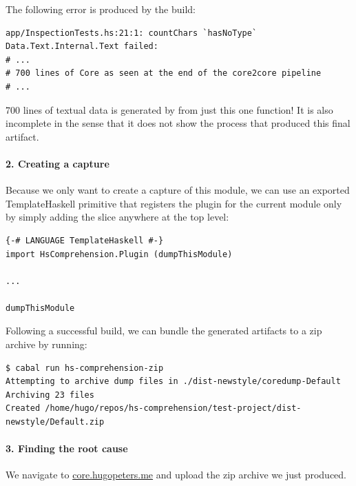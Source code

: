 The following error is produced by the build:

\begin{verbatim}
app/InspectionTests.hs:21:1: countChars `hasNoType` Data.Text.Internal.Text failed:
# ...
# 700 lines of Core as seen at the end of the core2core pipeline
# ...
\end{verbatim}

700 lines of textual data is generated by  from just this one function!
It is also incomplete in the sense that it does not show the process that produced this final
artifact.

\paragraph{2. Creating a capture}

Because we only want to create a capture of this module, we can use an exported TemplateHaskell primitive
that registers the plugin for the current module only by simply adding the  slice 
anywhere at the top level: 

\begin{listing}[H]
\begin{verbatim}
{-# LANGUAGE TemplateHaskell #-}
import HsComprehension.Plugin (dumpThisModule)

...

dumpThisModule
\end{verbatim}
\end{listing}

Following a successful build, we can bundle the generated artifacts to a zip archive by running:

\begin{listing}[H]
\begin{verbatim}
$ cabal run hs-comprehension-zip
Attempting to archive dump files in ./dist-newstyle/coredump-Default
Archiving 23 files
Created /home/hugo/repos/hs-comprehension/test-project/dist-newstyle/Default.zip
\end{verbatim}
\end{listing}

\paragraph{3. Finding the root cause}
We navigate to \href{https://core.hugopeters.me}{core.hugopeters.me} and upload the zip archive we just
produced.

